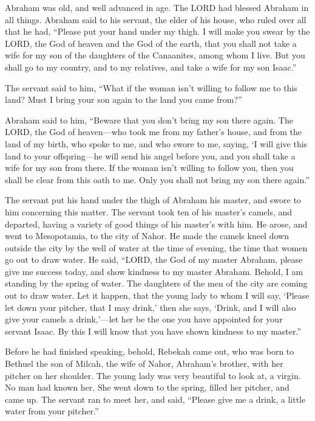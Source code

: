 \mychapter{}
\myverse*{}Abraham was old, and well advanced in age. The LORD had blessed Abraham in all things. \myverse{}Abraham said to his servant, the elder of his house, who ruled over all that he had, “Please put your hand under my thigh. \myverse{}I will make you swear by the LORD, the God of heaven and the God of the earth, that you shall not take a wife for my son of the daughters of the Canaanites, among whom I live. \myverse{}But you shall go to my country, and to my relatives, and take a wife for my son Isaac.”

\myverse{}The servant said to him, “What if the woman isn’t willing to follow me to this land? Must I bring your son again to the land you came from?”

\myverse{}Abraham said to him, “Beware that you don’t bring my son there again. \myverse{}The LORD, the God of heaven—who took me from my father’s house, and from the land of my birth, who spoke to me, and who swore to me, saying, ‘I will give this land to your offspring—he will send his angel before you, and you shall take a wife for my son from there. \myverse{}If the woman isn’t willing to follow you, then you shall be clear from this oath to me. Only you shall not bring my son there again.”

\myverse{}The servant put his hand under the thigh of Abraham his master, and swore to him concerning this matter. \myverse{}The servant took ten of his master’s camels, and departed, having a variety of good things of his master’s with him. He arose, and went to Mesopotamia, to the city of Nahor. \myverse{}He made the camels kneel down outside the city by the well of water at the time of evening, the time that women go out to draw water. \myverse{}He said, “LORD, the God of my master Abraham, please give me success today, and show kindness to my master Abraham. \myverse{}Behold, I am standing by the spring of water. The daughters of the men of the city are coming out to draw water. \myverse{}Let it happen, that the young lady to whom I will say, ‘Please let down your pitcher, that I may drink,’ then she says, ‘Drink, and I will also give your camels a drink,’—let her be the one you have appointed for your servant Isaac. By this I will know that you have shown kindness to my master.”

\myverse{}Before he had finished speaking, behold, Rebekah came out, who was born to Bethuel the son of Milcah, the wife of Nahor, Abraham’s brother, with her pitcher on her shoulder. \myverse{}The young lady was very beautiful to look at, a virgin. No man had known her. She went down to the spring, filled her pitcher, and came up. \myverse{}The servant ran to meet her, and said, “Please give me a drink, a little water from your pitcher.”

